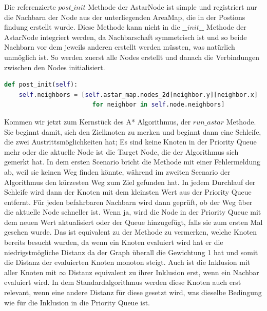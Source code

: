 Die referenzierte $post\_init$ Methode der AstarNode ist simple und registriert nur die Nachbarn der Node aus der
unterliegenden AreaMap, die in der Postions findung erstellt wurde.
Diese Methode kann nicht in die $\_\_init\_\_$ Methode der AstarNode integriert werden, da Nachbarschaft symmetrisch ist
und so beide Nachbarn vor dem jeweils anderen erstellt werden müssten, was natürlich unmöglich ist.
So werden zuerst alle Nodes erstellt und danach die Verbindungen zwischen den Nodes initialisiert.
\begin{lstlisting}[language=python,label={lst:astar_node_init}]
def post_init(self):
    self.neighbors = [self.astar_map.nodes_2d[neighbor.y][neighbor.x]
                        for neighbor in self.node.neighbors]
\end{lstlisting}

Kommen wir jetzt zum Kernstück des A* Algorithmus, der $run\_astar$ Methode.
Sie beginnt damit, sich den Zielknoten zu merken und beginnt dann eine Schleife, die zwei Austrittsmöglichkeiten hat;
Es sind keine Knoten in der Priority Queue mehr oder die aktuelle Node ist die Target Node, die der Algorithmus sich gemerkt
hat.
In dem ersten Scenario bricht die Methode mit einer Fehlermeldung ab, weil sie keinen Weg finden könnte, während im
zweiten Scenario der Algorithmus den kürzesten Weg zum Ziel gefunden hat.
In jedem Durchlauf der Schleife wird dann der Knoten mit dem kleinsten Wert aus der Priority Queue entfernt.
Für jeden befahrbaren Nachbarn wird dann geprüft, ob der Weg über die aktuelle Node schneller ist.
Wenn ja, wird die Node in der Priority Queue mit dem neuen Wert aktualisiert oder der Queue hinzugefügt, falls sie
zum ersten Mal gesehen wurde.
Das ist equivalent zu der Methode zu vermerken, welche Knoten bereits besucht wurden, da wenn ein Knoten evaluiert wird
hat er die niedrigstmögliche Distanz da der Graph überall die Gewichtung 1 hat und somit die Distanz der evaluierten
Knoten monoton steigt.
Auch ist die Inklusion mit aller Knoten mit $\infty$ Distanz equivalent zu ihrer Inklusion erst, wenn ein Nachbar evaluiert wird.
In dem Standardalgorithmus werden diese Knoten auch erst relevant, wenn eine andere Distanz für diese gesetzt wird, was
dieselbe Bedingung wie für die Inklusion in die Priority Queue ist.
